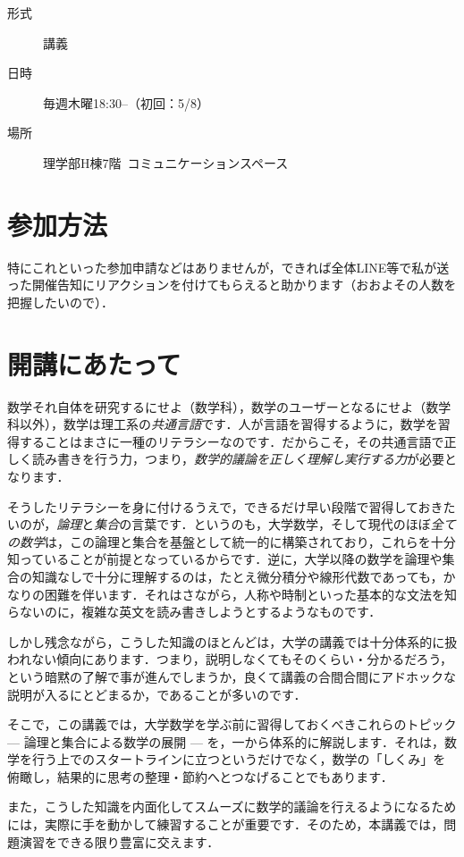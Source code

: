 \documentclass[lualatex, ja=standard, b5j, base=9pt, label-section=none]{bxjsarticle}
\def\kt{\ltjkenten}
\begin{document}
\begin{multicols*}{2}
  \begin{description}
    \item[形式] 講義
    \item[日時] 毎週木曜18:30--（初回：5/8）
    \item[場所] 理学部H棟7階\ コミュニケーションスペース
  \end{description}


  \section{参加方法}

  特にこれといった参加申請などはありませんが，できれば全体LINE等で私が送った開催告知にリアクションを付けてもらえると助かります（おおよその人数を把握したいので）．


  \section{開講にあたって}

  数学それ自体を研究するにせよ（数学科），数学のユーザーとなるにせよ（数学科以外），数学は理工系の\emph{共通言語}です．人が言語を習得するように，数学を習得することはまさに一種のリテラシーなのです．だからこそ，その共通言語で正しく読み書きを行う力，つまり，\emph{数学的議論を正しく理解し実行する力}が必要となります．

  そうしたリテラシーを身に付けるうえで，できるだけ早い段階で習得しておきたいのが，\emph{論理}と\emph{集合}の言葉です．というのも，大学数学，そして現代のほぼ\emph{全ての数学}は，この論理と集合を基盤として統一的に構築されており，これらを十分知っていることが前提となっているからです．逆に，大学以降の数学を論理や集合の知識なしで十分に理解するのは，たとえ微分積分や線形代数であっても，かなりの困難を伴います．それはさながら，人称や時制といった基本的な文法を知らないのに，複雑な英文を読み書きしようとするようなものです．

  しかし残念ながら，こうした知識のほとんどは，大学の講義では十分体系的に扱われない傾向にあります．つまり，説明しなくてもそのくらい\kt{感覚的}・\kt{常識的に}分かるだろう，という暗黙の了解で事が進んでしまうか，良くて講義の合間合間にアドホックな説明が入るにとどまるか，であることが多いのです．

  そこで，この講義では，大学数学を学ぶ前に習得しておくべきこれらのトピック --- 論理と集合による数学の展開 --- を，一から体系的に解説します．それは，数学を行う上でのスタートラインに立つというだけでなく，数学の「しくみ」を俯瞰し，結果的に思考の整理・節約へとつなげることでもあります．

  また，こうした知識を内面化してスムーズに数学的議論を行えるようになるためには，実際に手を動かして練習することが重要です．そのため，本講義では，問題演習をできる限り豊富に交えます．

\end{multicols*}
\end{document}
